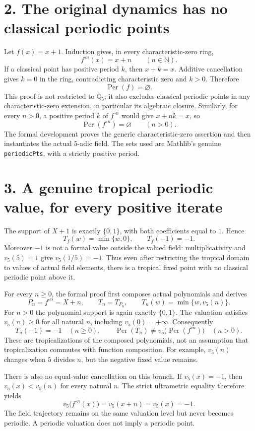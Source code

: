 \documentclass[10pt]{article}
\newcommand{\Q}{\mathbb Q_5}
\newcommand{\Per}{\operatorname{Per}}
\begin{document}
\section*{2. The original dynamics has no classical periodic points}
Let $f(x)=x+1$. Induction gives, in every characteristic-zero ring,
\[
f^{\circ n}(x)=x+n \qquad(n\in\mathbb N).
\]
If a classical point has positive period $k$, then $x+k=x$. Additive cancellation gives $k=0$ in the ring, contradicting characteristic zero and $k>0$. Therefore
\[
\Per(f)=\varnothing.
\]
This proof is not restricted to $\Q$; it also excludes classical periodic points in any characteristic-zero extension, in particular its algebraic closure. Similarly, for every $n>0$, a positive period $k$ of $f^{\circ n}$ would give $x+nk=x$, so
\[
\Per(f^{\circ n})=\varnothing\qquad(n>0).
\]
The formal development proves the generic characteristic-zero assertion and then instantiates the actual $5$-adic field. The sets used are Mathlib's genuine \texttt{periodicPts}, with a strictly positive period.

\section*{3. A genuine tropical periodic value, for every positive iterate}
The support of $X+1$ is exactly $\{0,1\}$, with both coefficients equal to $1$. Hence
\[
T_f(w)=\min\{w,0\},\qquad T_f(-1)=-1.
\]
Moreover $-1$ is not a formal value outside the valued field: multiplicativity and $v_5(5)=1$ give $v_5(1/5)=-1$. Thus even after restricting the tropical domain to values of actual field elements, there is a tropical fixed point with no classical periodic point above it.

For every $n\ge0$, the formal proof first composes actual polynomials and derives
\[
P_n=f^{\circ n}=X+n,\qquad
T_n=T_{P_n},\qquad T_n(w)=\min\{w,v_5(n)\}.
\]
For $n>0$ the polynomial support is again exactly $\{0,1\}$. The valuation satisfies $v_5(n)\ge0$ for all natural $n$, including $v_5(0)=+\infty$. Consequently
\[
T_n(-1)=-1\quad(n\ge0),\qquad
\Per(T_n)\ne v_5\bigl(\Per(f^{\circ n})\bigr)\quad(n>0).
\]
These are tropicalizations of the composed polynomials, not an assumption that tropicalization commutes with function composition. For example, $v_5(n)$ changes when $5$ divides $n$, but the negative fixed value remains.

There is also no equal-value cancellation on this branch. If $v_5(x)=-1$, then $v_5(x)<v_5(n)$ for every natural $n$. The strict ultrametric equality therefore yields
\[
v_5\bigl(f^{\circ n}(x)\bigr)=v_5(x+n)=v_5(x)=-1.
\]
The field trajectory remains on the same valuation level but never becomes periodic. A periodic valuation does not imply a periodic point.
\end{document}

